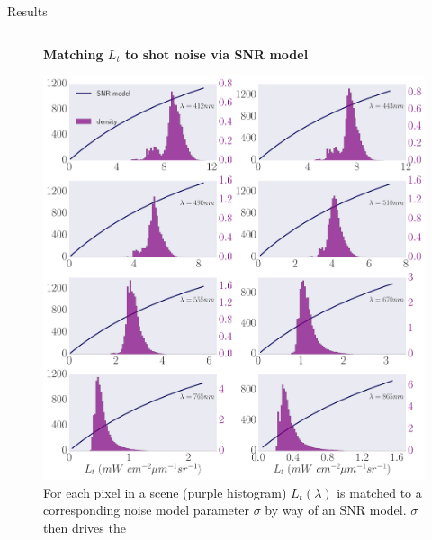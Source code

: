 \documentclass[final]{beamer}
\newlength{\onecolwid}
\newlength{\twocolwid}
\begin{document}
\begin{frame}[t]
\begin{columns}[t]
\begin{column}{\twocolwid}
\begin{block}{Results}
\begin{columns}[t,totalwidth=\twocolwid]
\begin{column}{\onecolwid}
\begin{figure}
\centering
\textbf{Matching $L_t$ to shot noise via SNR model}\par\medskip
\includegraphics[width=1.0\linewidth]{snrmodelLong.pdf}
\\{For each pixel in a scene (purple histogram) $L_t(\lambda)$  is matched to a  corresponding noise  model parameter $\sigma$ by way of an SNR model. $\sigma$ then drives the}
\end{figure}



\end{column}
\end{columns}
\end{block}
\end{column}
\end{columns}
\end{frame}
\end{document}
